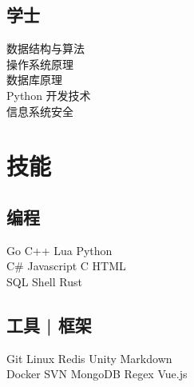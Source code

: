 \documentclass[]{deedy-resume-openfont}
\begin{document}
\begin{minipage}[t]{0.25\textwidth}
\subsection{学士}
数据结构与算法 \\
操作系统原理 \\ 
数据库原理 \\
Python 开发技术 \\
信息系统安全 \\


\section{技能}
\sectionsep
\subsection{编程}
Go \textbullet{} C++ \textbullet{} Lua \textbullet{} Python \\
C\# \textbullet{} Javascript \textbullet{} C \textbullet{} HTML \\
SQL \textbullet{} Shell \textbullet{} Rust \\ 
\sectionsep

\subsection{工具 | 框架}
Git \textbullet{} Linux \textbullet{} Redis \textbullet{} Unity \textbullet{} Markdown \\
Docker  \textbullet{} SVN \textbullet{} MongoDB \textbullet{} Regex \textbullet{} Vue.js \\
\sectionsep

%
%

\end{minipage} 
\hfill
\end{document}

